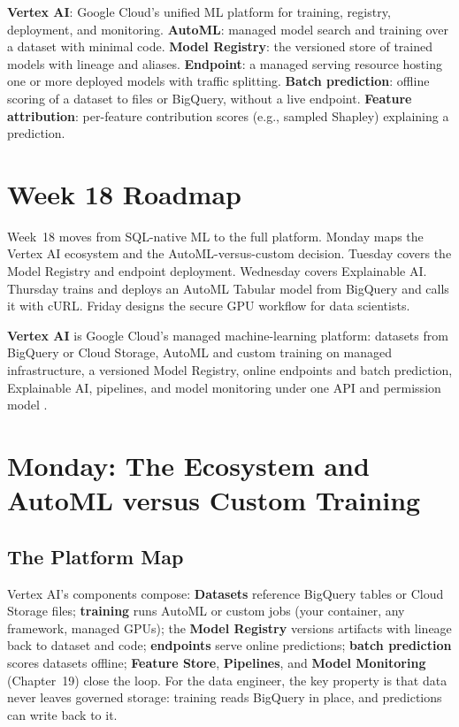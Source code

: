 \begin{keyterms}
\textbf{Vertex AI}: Google Cloud's unified ML platform for training, registry, deployment, and monitoring.
\textbf{AutoML}: managed model search and training over a dataset with minimal code.
\textbf{Model Registry}: the versioned store of trained models with lineage and aliases.
\textbf{Endpoint}: a managed serving resource hosting one or more deployed models with traffic splitting.
\textbf{Batch prediction}: offline scoring of a dataset to files or BigQuery, without a live endpoint.
\textbf{Feature attribution}: per-feature contribution scores (e.g., sampled Shapley) explaining a prediction.
\end{keyterms}

\section{Week 18 Roadmap}
Week~18 moves from SQL-native ML to the full platform. Monday maps the Vertex AI ecosystem and the AutoML-versus-custom decision. Tuesday covers the Model Registry and endpoint deployment. Wednesday covers Explainable AI. Thursday trains and deploys an AutoML Tabular model from BigQuery and calls it with cURL. Friday designs the secure GPU workflow for data scientists.

\begin{definitionbox}
\textbf{Vertex AI} is Google Cloud's managed machine-learning platform: datasets from BigQuery or Cloud Storage, AutoML and custom training on managed infrastructure, a versioned Model Registry, online endpoints and batch prediction, Explainable AI, pipelines, and model monitoring under one API and permission model \cite{googlecloudvertexaidocs}.
\end{definitionbox}

\section{Monday: The Ecosystem and AutoML versus Custom Training}

\subsection{The Platform Map}
Vertex AI's components compose: \textbf{Datasets} reference BigQuery tables or Cloud Storage files; \textbf{training} runs AutoML or custom jobs (your container, any framework, managed GPUs); the \textbf{Model Registry} versions artifacts with lineage back to dataset and code; \textbf{endpoints} serve online predictions; \textbf{batch prediction} scores datasets offline; \textbf{Feature Store}, \textbf{Pipelines}, and \textbf{Model Monitoring} (Chapter~19) close the loop. For the data engineer, the key property is that data never leaves governed storage: training reads BigQuery in place, and predictions can write back to it.

